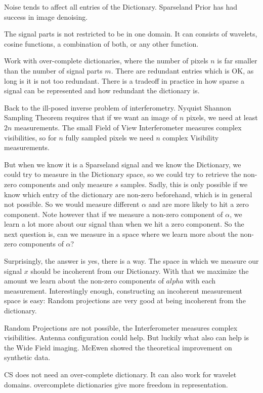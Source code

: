 Noise tends to affect all entries of the Dictionary. Sparseland Prior has had success in image denoising.

The signal parts is not restricted to be in one domain. It can consists of wavelets, cosine functions, a combination of both, or any other function. 

Work with over-complete dictionaries, where the number of pixels $n$ is far smaller than the number of signal parts $m$. There are redundant entries which is OK, as long is it is not too redundant. There is a tradeoff in practice in how sparse a signal can be represented and how redundant the dictionary is.

Back to the ill-posed inverse problem of interferometry. Nyquist Shannon Sampling Theorem requires that if we want an image of $n$ pixels, we need at least $2n$ measurements. The small Field of View Interferometer measures complex visibilities, so for $n$ fully sampled pixels we need $n$ complex Visibility measurements.

But when we know it is a Sparseland signal and we know the Dictionary, we could try to measure in the Dictionary space, so we could try to retrieve the non-zero components and only measure $s$ samples. Sadly, this is only possible if we know which entry of the dictionary are non-zero beforehand, which is in general not possible. So we would measure different $\alpha$ and are more likely to hit a zero component. Note however that if we measure a non-zero component of $\alpha$, we learn a lot more about our signal than when we hit a zero component. So the next question is, can we measure in a space where we learn more about the non-zero components of $\alpha$?

Surprisingly, the answer is yes, there is a way. The space in which we measure our signal $x$ should be incoherent from our Dictionary. With that we maximize the amount we learn about the non-zero components of $alpha$ with each measurement. Interestingly enough, constructing an incoherent measurement space is easy: Random projections are very good at being incoherent from the dictionary. 

Random Projections are not possible, the Interferometer measures complex visibilities. Antenna configuration could help. But luckily what also can help is the Wide Field imaging. McEwen \cite{mcewen2011compressed} showed the theoretical improvement on synthetic data.

CS does not need an over-complete dictionary. It can also work for wavelet domains. overcomplete dictionaries give more freedom in representation.

